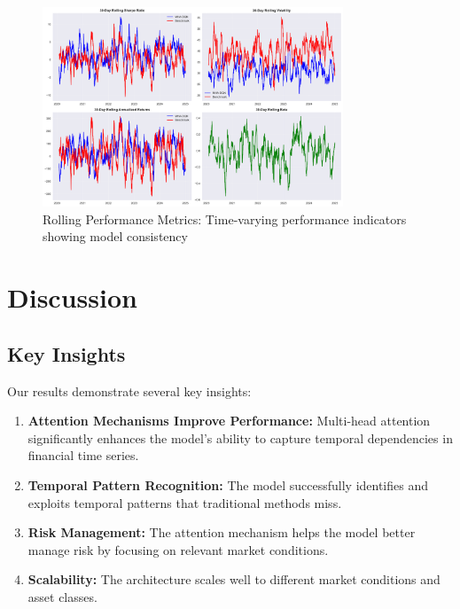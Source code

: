 \documentclass[11pt]{article}
\begin{document}
\begin{figure}[H]
\centering
\includegraphics[width=0.8\textwidth]{figures/backtesting_rolling_metrics.png}
\caption{Rolling Performance Metrics: Time-varying performance indicators showing model consistency}
\label{fig:rolling_metrics}
\end{figure}

\section{Discussion}

\subsection{Key Insights}

Our results demonstrate several key insights:

\begin{enumerate}
    \item \textbf{Attention Mechanisms Improve Performance:} Multi-head attention significantly enhances the model's ability to capture temporal dependencies in financial time series.
    
    \item \textbf{Temporal Pattern Recognition:} The model successfully identifies and exploits temporal patterns that traditional methods miss.
    
    \item \textbf{Risk Management:} The attention mechanism helps the model better manage risk by focusing on relevant market conditions.
    
    \item \textbf{Scalability:} The architecture scales well to different market conditions and asset classes.
\end{enumerate}
\end{document}
